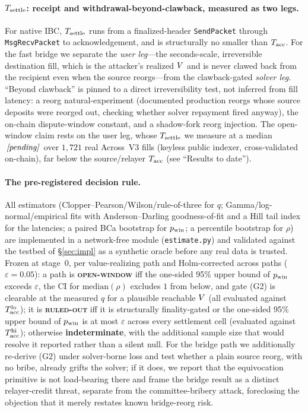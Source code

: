 \paragraph{$T_{\mathrm{settle}}$: receipt and withdrawal-beyond-clawback, measured as two legs.}
For native IBC, $T_{\mathrm{settle}}$ runs from a finalized-header \texttt{SendPacket} through
\texttt{MsgRecvPacket} to acknowledgement, and is structurally no smaller than $T_{\mathrm{acc}}$. For the fast
bridge we separate the \emph{user leg}---the seconds-scale, irreversible destination fill, which is
the attacker's realized $V$ and is never clawed back from the recipient even when the source
reorgs---from the clawback-gated \emph{solver leg}. ``Beyond clawback'' is pinned to a direct
irreversibility test, not inferred from fill latency: a reorg natural-experiment (documented
production reorgs whose source deposits were reorged out, checking whether solver repayment fired
anyway), the on-chain dispute-window constant, and a shadow-fork reorg injection. The open-window
claim rests on the user leg, whose $T_{\mathrm{settle}}$ we measure at a median $\,\textit{[pending]}\,$ over
$1{,}721$ real Across~V3 fills (keyless public indexer, cross-validated on-chain), far below the
source/relayer $T_{\mathrm{acc}}$ (see ``Results to date'').

\paragraph{The pre-registered decision rule.}
All estimators (Clopper--Pearson/Wilson/rule-of-three for $q$; Gamma/log-normal/empirical fits with
Anderson--Darling goodness-of-fit and a Hill tail index for the latencies; a paired BCa bootstrap
for $p_{\mathrm{win}}$; a percentile bootstrap for $\rho$) are implemented in a network-free module
(\texttt{estimate.py}) and validated against the testbed of \S\ref{sec:impl} as a synthetic oracle
before any real data is trusted. Frozen at stage~0, per value-realizing path and Holm-corrected
across paths ($\varepsilon=0.05$): a path is \textbf{\textsc{open-window}} iff the one-sided 95\%
upper bound of $p_{\mathrm{win}}$ exceeds $\varepsilon$, the CI for $\mathrm{median}(\rho)$ excludes $1$ from
below, and gate (G2) is clearable at the measured $q$ for a plausible reachable $V$ (all
evaluated against $T_{\mathrm{acc}}^{\mathrm{lo}}$); it is \textbf{\textsc{ruled-out}} iff it is structurally
finality-gated or the one-sided 95\% upper bound of $p_{\mathrm{win}}$ is at most $\varepsilon$ across every
settlement cell (evaluated against $T_{\mathrm{acc}}^{\mathrm{hi}}$); otherwise \textbf{indeterminate}, with
the additional sample size that would resolve it reported rather than a silent null. For the
bridge path we additionally re-derive (G2) under solver-borne loss and test whether a plain source
reorg, with no bribe, already grifts the solver; if it does, we report that the equivocation
primitive is not load-bearing there and frame the bridge result as a distinct relayer-credit threat,
separate from the committee-bribery attack, foreclosing the objection that it merely restates known
bridge-reorg risk.

